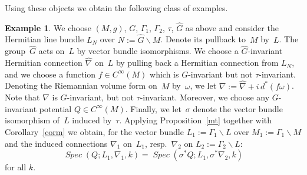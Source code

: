 \documentclass[12pt,leqno]{amsart}%
\theoremstyle{definition}
\newtheorem{example}[theorem]{Example}
\theoremstyle{remark}
\numberwithin{equation}{section}
\def\Spec{\operatorname{\textit{Spec}}}
\begin{document}
Using these objects we obtain the following class of examples.

\begin{example}
\label{surf} We choose $(M,g)$, $G$, $\Gamma_{1}$, $\Gamma_{2}$, $\tau$,
$\widehat G$ as above and consider the Hermitian line bundle $L_{N}$ over $N:=\widehat
G\backslash M$. Denote its pullback to~$M$ by~$L$. The group~$\widehat G$ acts
on~$L$ by vector bundle isomorphisms. We choose a $\widehat G$-invariant Hermitian
connection $\widehat{\nabla}$ on~$L$ by pulling back a Hermitian connection from
$L_{N}$, and we choose a function $f\in C^{\infty}(M)$ which is $G$-invariant
but not $\tau$-invariant. Denoting the Riemannian volume form on~$M$
by~$\omega$, we let ${\nabla}:=\widehat{\nabla}+i\,d^*(f\omega)$. Note that
${\nabla}$ is $G$-invariant, but not $\tau$-invariant. Moreover, we choose any
$G$-invariant potential $Q\in C^{\infty}(M)$. Finally, we let~$\sigma$ denote
the vector bundle isomorphism of~$L$ induced by~$\tau$. Applying
Proposition~\ref{mt} together with Corollary~\ref{corm} we obtain, for the
vector bundle $L_{1}:=\Gamma_{1}\backslash L$ over $M_{1}:=\Gamma_{1}\backslash
M$ and the induced connections ${\nabla}_{1}$ on~$L_{1}$, resp.~${\nabla}_{2}$
on $L_{2}:=\Gamma_{2}\backslash L$:
\[
{\Spec}(Q;L_{1},{\nabla}_{1},k)={\Spec}(\sigma^{*}Q;L_{1},\sigma^{*}{\nabla}_{2}
,k)
\]
for all $k$.
\end{example}
\end{document}
